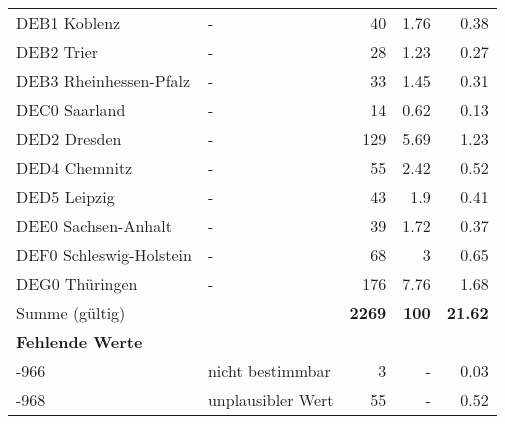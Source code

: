 \begin{longtable}{Xlrrr}
        \multicolumn{1}{X}{DEB1 Koblenz} & - & \num{40} & \num[round-mode=places,round-precision=2]{1.76} & \num[round-mode=places,round-precision=2]{0.38} \\
        \multicolumn{1}{X}{DEB2 Trier} & - & \num{28} & \num[round-mode=places,round-precision=2]{1.23} & \num[round-mode=places,round-precision=2]{0.27} \\
        \multicolumn{1}{X}{DEB3 Rheinhessen-Pfalz} & - & \num{33} & \num[round-mode=places,round-precision=2]{1.45} & \num[round-mode=places,round-precision=2]{0.31} \\
        \multicolumn{1}{X}{DEC0 Saarland} & - & \num{14} & \num[round-mode=places,round-precision=2]{0.62} & \num[round-mode=places,round-precision=2]{0.13} \\
        \multicolumn{1}{X}{DED2 Dresden} & - & \num{129} & \num[round-mode=places,round-precision=2]{5.69} & \num[round-mode=places,round-precision=2]{1.23} \\
        \multicolumn{1}{X}{DED4 Chemnitz} & - & \num{55} & \num[round-mode=places,round-precision=2]{2.42} & \num[round-mode=places,round-precision=2]{0.52} \\
        \multicolumn{1}{X}{DED5 Leipzig} & - & \num{43} & \num[round-mode=places,round-precision=2]{1.9} & \num[round-mode=places,round-precision=2]{0.41} \\
        \multicolumn{1}{X}{DEE0 Sachsen-Anhalt} & - & \num{39} & \num[round-mode=places,round-precision=2]{1.72} & \num[round-mode=places,round-precision=2]{0.37} \\
        \multicolumn{1}{X}{DEF0 Schleswig-Holstein} & - & \num{68} & \num[round-mode=places,round-precision=2]{3} & \num[round-mode=places,round-precision=2]{0.65} \\
        \multicolumn{1}{X}{DEG0 Thüringen} & - & \num{176} & \num[round-mode=places,round-precision=2]{7.76} & \num[round-mode=places,round-precision=2]{1.68} \\
     \midrule
      \multicolumn{2}{l}{Summe (gültig)} & \textbf{\num{2269}} &
      \textbf{\num{100}} &
         \textbf{\num[round-mode=places,round-precision=2]{21.62}} \\
     \multicolumn{5}{l}{\textbf{Fehlende Werte}}\\
       -966 & nicht bestimmbar & \num{3} & - & \num[round-mode=places,round-precision=2]{0.03} \\

       -968 & unplausibler Wert & \num{55} & - & \num[round-mode=places,round-precision=2]{0.52} \\


\end{longtable}
